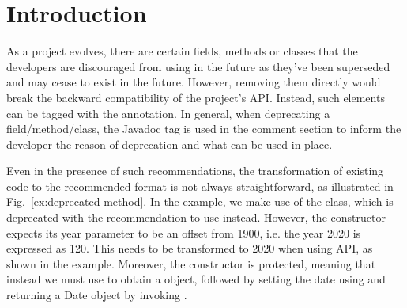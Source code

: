 \documentclass[runningheads,a4paper]{llncs}
\begin{document}






\section{Introduction}

As a project evolves, there are certain fields, methods or classes
that the developers are discouraged from using in the future as
they've been superseded and may cease to exist in the future.
However, removing them directly would break the backward compatibility
of the project's API.  Instead, such elements can be tagged with the
 annotation.  In general, when deprecating a
field/method/class, the  Javadoc tag is used in the
comment section to inform the developer the reason of deprecation and
what can be used in place.



Even in the presence of such recommendations, the transformation of
existing code to the recommended format is not always straightforward,
as illustrated in Fig.~\ref{ex:deprecated-method}. In the example, we
make use of the  class, which is deprecated with the
recommendation to use  instead.  However, the
 constructor expects its year parameter to be an offset
from 1900, i.e. the year 2020 is expressed as 120.  This needs to be
transformed to 2020 when using  API, as shown in the
example. Moreover, the  constructor is protected,
meaning that instead we must use  to obtain a
 object, followed by setting the date using 
and returning a Date object by invoking .
\end{document}
